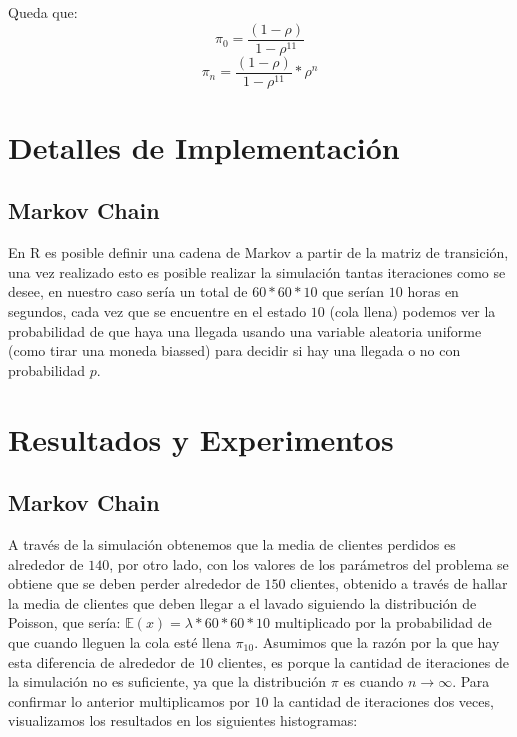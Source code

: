 \documentclass[14pt]{extarticle}
\begin{document}
Queda que: 
	$$\pi_0 = \frac{(1 - \rho)}{1 - \rho^{11}}$$
	$$\pi_n = \frac{(1 - \rho)} { 1 - \rho^{11}} * \rho^n$$

\section{Detalles de Implementación}

\subsection{Markov Chain}

En R es posible definir una cadena de Markov a partir de la matriz de transición, una vez realizado esto es posible realizar la simulación tantas iteraciones como se desee, en nuestro caso sería un total de $60 * 60 * 10$ que serían $10$ horas en segundos, cada vez que se encuentre en el estado $10$ (cola llena) podemos ver la probabilidad de que haya una llegada usando una variable aleatoria uniforme (como tirar una moneda biassed) para decidir si hay una llegada o no con probabilidad $p$.

\section{Resultados y Experimentos}

\subsection{Markov Chain}

    A través de la simulación obtenemos que la media de clientes perdidos es alrededor de $140$, por otro lado, con los valores de los parámetros del problema se obtiene que se deben perder alrededor de $150$ clientes, obtenido a través de hallar la media de clientes que deben llegar a el lavado siguiendo la distribución de Poisson, que sería: $\mathbb{E}(x) = \lambda * 60 * 60 * 10$ multiplicado por la probabilidad de que cuando lleguen la cola esté llena $\pi_{10}$. Asumimos que la razón por la que hay esta diferencia de alrededor de $10$ clientes, es porque la cantidad de iteraciones de la simulación no es suficiente, ya que la distribución $\pi$ es cuando $n \to \infty$. Para confirmar lo anterior multiplicamos por $10$ la cantidad de iteraciones dos veces, visualizamos los resultados en los siguientes histogramas:

    \begin{figure}[htbp]
  \centering
  

\end{figure}
\end{document}
